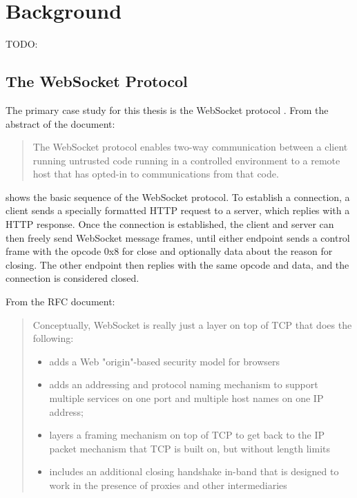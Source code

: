 \chapter{Background}
\label{chap:background}

TODO:


\section{The WebSocket Protocol}
The primary case study for this thesis is the WebSocket protocol 
\cite{draft-ietf-hybi-thewebsocketprotocol}. From the abstract of the document:
\begin{quote}The WebSocket protocol enables two-way communication between a
client running untrusted code running in a controlled environment to a
remote host that has opted-in to communications from that code.
\end{quote}


 shows the basic sequence of the WebSocket protocol. To
establish a connection, a client sends a specially formatted HTTP request to a
server, which replies with a HTTP response. Once the connection is
established, the client and server can then freely send WebSocket message
frames, until either endpoint sends a control frame with the opcode 0x8 for
close and optionally data about the reason for closing. The other endpoint then
replies with the same opcode and data, and the connection is considered closed.

From the RFC document:

\begin{quote}
	Conceptually, WebSocket is really just a layer on top of TCP that
	does the following:
	\begin{itemize}
		\item adds a Web "origin"-based security model for browsers
	
		\item adds an addressing and protocol naming mechanism to support
		multiple services on one port and multiple host names on one IP
		address;
	
		\item layers a framing mechanism on top of TCP to get back to the IP
		packet mechanism that TCP is built on, but without length limits
	
		\item includes an additional closing handshake in-band that is designed
		to work in the presence of proxies and other intermediaries
	\end{itemize}
\end{quote}

